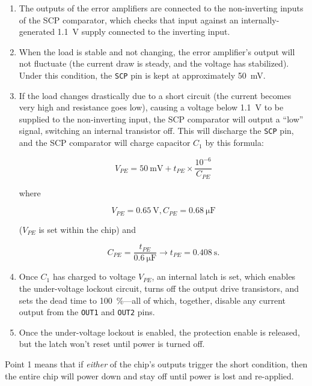 \documentclass{article}
\newcommand{\chippin}{\texttt}
\begin{document}
\begin{enumerate}
\item The outputs of the error amplifiers are connected to the
  non-inverting inputs of the SCP comparator, which checks that input
  against an internally-generated \qty{1.1}{\volt} supply connected to
  the inverting input.
\item When the load is stable and not changing, the error amplifier's
  output will not fluctuate (the current draw is steady, and the
  voltage has stabilized). Under this condition, the \chippin{SCP} pin
  is kept at approximately \qty{50}{\milli\volt}.
\item If the load changes drastically due to a short circuit (the
  current becomes very high and resistance goes low), causing a
  voltage below \qty{1.1}{\volt} to be supplied to the non-inverting
  input, the SCP comparator will output a ``low'' signal, switching an
  internal transistor off. This will discharge the \chippin{SCP} pin,
  and the SCP comparator will charge capacitor $C_1$ by this formula:

\begin{displaymath}
  V_{PE} = \qty{50}{\milli\volt} + t_{PE} \times
  \frac{10^{-6}}{C_{PE}}
\end{displaymath}

where

\begin{displaymath}
  V_{PE} = \qty{0.65}{\volt}, C_{PE} = \qty{0.68}{\micro\farad}
\end{displaymath}

($V_{PE}$ is set within the chip) and

\begin{displaymath}
  C_{PE} = \frac{t_{PE}}{\qty{0.6}{\micro\farad}}
  \rightarrow{} t_{PE} = \qty{0.408}{\second}.
\end{displaymath}

\item Once $C_1$ has charged to voltage $V_{PE}$, an internal latch is
  set, which enables the under-voltage lockout circuit, turns off the
  output drive transistors, and sets the dead time to \qty{100}{\%}---all of
  which, together, disable any current output from the \chippin{OUT1}
  and \chippin{OUT2} pins.
\item Once the under-voltage lockout is enabled, the protection enable
  is released, but the latch won't reset until power is turned off.
\end{enumerate}

Point 1 means that if \emph{either} of the chip's outputs trigger the
short condition, then the entire chip will power down and stay off
until power is lost and re-applied.
\end{document}
